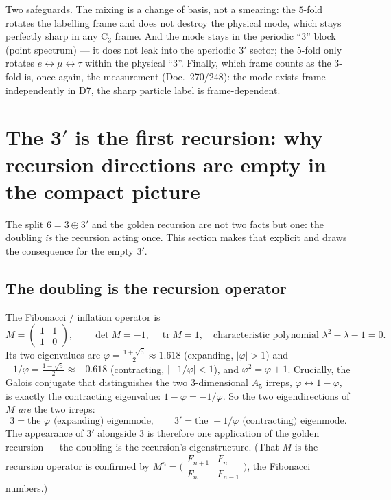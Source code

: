 Two safeguards. The mixing is a change of basis, not a smearing: the $5$-fold rotates the
labelling frame and does not destroy the physical mode, which stays perfectly sharp in any
C$_3$ frame. And the mode stays in the periodic \enquote{$3$} block (point spectrum) --- it does
not leak into the aperiodic $3'$ sector; the $5$-fold only rotates $e\leftrightarrow\mu
\leftrightarrow\tau$ within the physical \enquote{$3$}. Finally, which frame counts as the
$3$-fold is, once again, the measurement (Doc.~270/248): the mode exists frame-independently in
D7, the sharp particle label is frame-dependent.

\section{The 3$'$ is the first recursion: why recursion directions are empty in the compact picture}
The split $6=3\oplus3'$ and the golden recursion are not two facts but one: the doubling
\emph{is} the recursion acting once. This section makes that explicit and draws the consequence
for the empty $3'$.

\subsection{The doubling is the recursion operator}
The Fibonacci / inflation operator is
\begin{equation}
M=\begin{pmatrix}1&1\\1&0\end{pmatrix},\qquad \det M=-1,\quad \operatorname{tr}M=1,\quad
\text{characteristic polynomial }\lambda^2-\lambda-1=0 .
\end{equation}
Its two eigenvalues are $\varphi=\tfrac{1+\sqrt5}{2}\approx1.618$ (expanding, $|\varphi|>1$) and
$-1/\varphi=\tfrac{1-\sqrt5}{2}\approx-0.618$ (contracting, $|{-}1/\varphi|<1$), and
$\varphi^2=\varphi+1$. Crucially, the Galois conjugate that distinguishes the two
$3$-dimensional $A_5$ irreps, $\varphi\leftrightarrow1-\varphi$, is exactly the contracting
eigenvalue: $1-\varphi=-1/\varphi$. So the two eigendirections of $M$ \emph{are} the two irreps:
\[
3 = \text{the }\varphi\text{ (expanding) eigenmode},\qquad
3' = \text{the }-1/\varphi\text{ (contracting) eigenmode}.
\]
The appearance of $3'$ alongside $3$ is therefore one application of the golden recursion --- the
doubling is the recursion's eigenstructure. (That $M$ is the recursion operator is confirmed by
$M^n=\bigl(\begin{smallmatrix}F_{n+1}&F_n\\F_n&F_{n-1}\end{smallmatrix}\bigr)$, the Fibonacci
numbers.)

